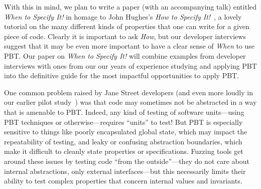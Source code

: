 With this in mind, we plan to write a paper
(with an accompanying talk)
entitled {\em When to Specify It!} in homage to
John Hughes's {\em How to Specify It!}~\cite{HowToSpecifyIt}, a lovely
tutorial on the many different kinds of properties that one can write
for a given piece
of code. Clearly it is important to ask {\em How}, but our developer interviews
suggest that it may be even more important to have a clear sense of {\em When}
to use PBT. Our paper on {\em When to Specify It!} will combine examples from developer
interviews with ones from our our years of experience studying and applying PBT
into the definitive guide for the most impactful opportunities to apply PBT.
\iflater{}
\fi

One common problem raised by Jane Street developers (and even more loudly
in our earlier pilot study~\cite{goldstein2022some}) was
that code may sometimes not be abstracted
in a way that is amenable to PBT. Indeed, any kind of
testing of software units---using PBT techniques or otherwise---requires
``units'' to test!  But PBT is
especially sensitive to things like poorly encapsulated global state, which may
impact the repeatability of testing, and leaky or confusing
abstraction boundaries, which make it difficult to cleanly state
properties or specifications.  Fuzzing tools get around these issues by
testing code ``from the outside''---they do not care about internal
abstractions, only external interfaces---but this necessarily limits their
ability to test complex properties that concern internal values and invariants.

